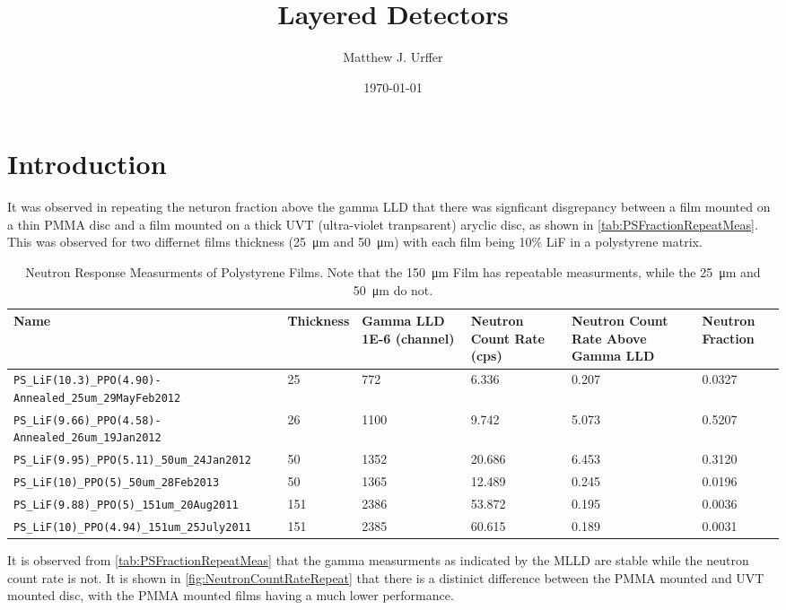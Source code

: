 \documentclass[draftcls,onecolumn]{IEEEtran}
\begin{document}
\title{Layered Detectors}
\author{Matthew J. Urffer}
\date{\today}
\maketitle


\listoftodos
\tableofcontents
\listoffigures
\listoftables
\lstlistoflistings
\section{Introduction}

It was observed in repeating the neturon fraction above the gamma LLD that there was signficant disgrepancy between a film mounted on a thin PMMA disc and a film mounted on a thick UVT (ultra-violet tranpsarent) aryclic disc, as shown in \autoref{tab:PSFractionRepeatMeas}.
This was observed for two differnet films thickness (\SI{25}{\um} and \SI{50}{\um}) with each film being 10\% LiF in a polystyrene matrix.
\begin{table}
	\centering
	\caption[PS Film Neutron Fraction Measurments]{Neutron Response Measurments of Polystyrene Films.  Note that the \SI{150}{\um} Film has repeatable measurments, while the \SI{25}{\um} and \SI{50}{\um} do not.}
	\label{tab:PSFractionRepeatMeas}
\begin{tabular}{m{2cm} | m{1cm} m{1.5cm} m{1.5cm} m{2cm} m{2cm}}
Name&Thickness&Gamma LLD \num{1E-6} (channel) & Neutron Count Rate (cps) & Neutron Count Rate Above Gamma LLD & Neutron Fraction\\
\hline
\hline
\verb+PS_LiF(10.3)_PPO(4.90)-Annealed_25um_29MayFeb2012+ & 25 & 772&6.336&0.207&0.0327 \\
\verb+PS_LiF(9.66)_PPO(4.58)-Annealed_26um_19Jan2012+    & 26&1100&9.742&5.073&0.5207 \\
\hline
\verb+PS_LiF(9.95)_PPO(5.11)_50um_24Jan2012+             &50&1352&20.686&6.453&0.3120 \\
\verb+PS_LiF(10)_PPO(5)_50um_28Feb2013+		  &50&1365&12.489&0.245&0.0196 \\
\hline
\verb+PS_LiF(9.88)_PPO(5)_151um_20Aug2011+	          &151&2386&53.872&0.195&0.0036 \\
\verb+PS_LiF(10)_PPO(4.94)_151um_25July2011+	          &151&2385&60.615&0.189&0.0031 \\
\end{tabular}
\end{table}
It is observed from \autoref{tab:PSFractionRepeatMeas} that the gamma measurments as indicated by the MLLD are stable while the neutron count rate is not. 
It is shown in \autoref{fig:NeutronCountRateRepeat} that there is a distinict difference between the PMMA mounted and UVT mounted disc, with the PMMA mounted films having a much lower performance.
\end{document}
